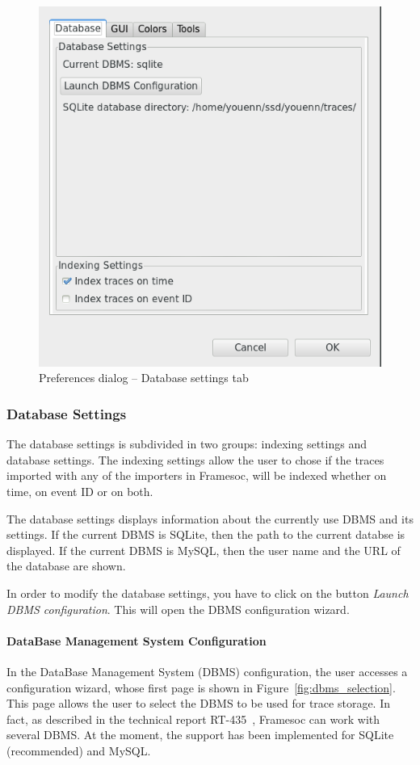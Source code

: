 \documentclass[twoside]{article}
\begin{document}
\begin{sloppypar}
\begin{figure}[h!]
	\centering
	\includegraphics[width=.5\textwidth]{images/pref_db.png}
	\caption{Preferences dialog -- Database settings tab}
	\label{fig:pref_dialog}
\end{figure} 

\subsubsection{Database Settings}
The database settings is subdivided in two groups: indexing settings and database settings. The indexing settings allow the user to chose if the traces imported with any of the importers in Framesoc, will be indexed whether on time, on event ID or on both. 

The database settings displays information about the currently use DBMS and its settings. If the current DBMS is SQLite, then the path to the current databse is displayed. If the current DBMS is MySQL, then the user name and the URL of the database are shown.

In order to modify the database settings, you have to click on the button \textit{Launch DBMS configuration}. This will open the DBMS configuration wizard.

\paragraph{DataBase Management System Configuration}
\label{subsec:init}

In the DataBase Management System (DBMS) configuration, the user accesses a configuration wizard, whose first page is shown in Figure~\ref{fig:dbms_selection}. 
This page allows the user to select the DBMS to be used for trace storage.
In fact, as described in the technical report RT-435~\cite{pagano:hal-00830008}, Framesoc can work with several DBMS.
At the moment, the support has been implemented for SQLite (recommended) and MySQL.


\end{sloppypar}
\end{document}
